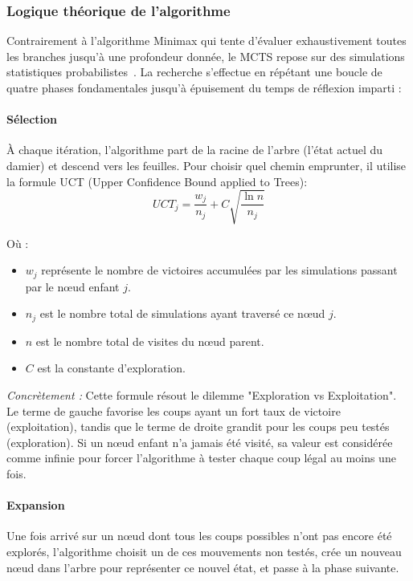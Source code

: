 \documentclass[a4paper]{article}
\begin{document}
\subsubsection{Logique théorique de l'algorithme}

Contrairement à l'algorithme Minimax qui tente d'évaluer exhaustivement toutes les branches jusqu'à une profondeur donnée, 
le MCTS repose sur des simulations statistiques probabilistes~\cite{wikipedia_mcts,geeksforgeeks_mcts}. La recherche s'effectue en répétant une boucle de quatre phases fondamentales
 jusqu'à épuisement du temps de réflexion imparti :

\paragraph{Sélection}
À chaque itération, l'algorithme part de la racine de l'arbre (l'état actuel du damier) et descend vers les feuilles. 
Pour choisir quel chemin emprunter, il utilise la formule UCT (Upper Confidence Bound applied to Trees):
$$UCT_{j} = \frac{w_{j}}{n_{j}} + C \sqrt{\frac{\ln n}{n_{j}}}$$

Où :
\begin{itemize}
    \item $w_j$ représente le nombre de victoires accumulées par les simulations passant par le nœud enfant $j$.
    \item $n_j$ est le nombre total de simulations ayant traversé ce nœud $j$.
    \item $n$ est le nombre total de visites du nœud parent.
    \item $C$ est la constante d'exploration.
\end{itemize}

\textit{Concrètement :} Cette formule résout le dilemme "Exploration vs Exploitation". Le terme de gauche 
favorise les coups ayant un fort taux de victoire (exploitation), tandis que le terme de droite grandit pour les coups peu testés
 (exploration). Si un nœud enfant n'a jamais été visité, sa valeur est considérée comme infinie pour forcer l'algorithme à tester chaque
  coup légal au moins une fois.

\paragraph{Expansion}
Une fois arrivé sur un nœud dont tous les coups possibles n'ont pas encore été explorés, l'algorithme choisit un de ces mouvements
 non testés, crée un nouveau nœud dans l'arbre pour représenter ce nouvel état, et passe à la phase suivante.
\end{document}
